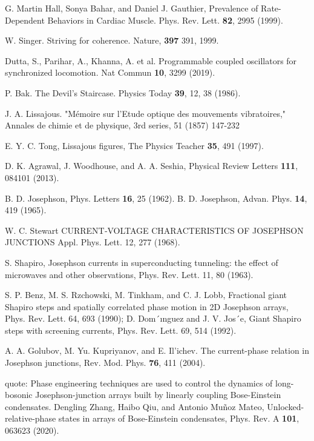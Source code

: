 \documentclass[twocolumn,preprintnumbers,amsmath,amssymb,aps,prx]{revtex4}
\begin{document}
\begin{thebibliography}{99}
   G. Martin Hall, Sonya Bahar, and Daniel J. Gauthier, Prevalence of Rate-Dependent Behaviors in Cardiac Muscle. Phys. Rev. Lett. {\bf 82}, 2995 (1999).

   W. Singer. Striving for coherence. Nature, {\bf 397} 391, 1999.

     Dutta, S., Parihar, A., Khanna, A. et al. Programmable coupled oscillators for synchronized locomotion. Nat Commun {\bf 10}, 3299 (2019).
    
     P. Bak. The Devil's Staircase. Physics Today {\bf 39}, 12, 38 (1986).

     J. A. Lissajous.  "Mémoire sur l'Etude optique des mouvements vibratoires,"  Annales de chimie et de physique, 3rd series, 51 (1857) 147-232

     E. Y. C. Tong, Lissajous figures, The Physics Teacher {\bf 35}, 491 (1997).

     D. K. Agrawal, J. Woodhouse, and A. A. Seshia, Physical Review Letters {\bf 111}, 084101 (2013).

     B. D. Josephson, Phys. Letters {\bf 16}, 25 (1962). 
     B. D. Josephson, Advan. Phys. {\bf 14}, 419 (1965).

      W. C. Stewart CURRENT‐VOLTAGE CHARACTERISTICS OF JOSEPHSON JUNCTIONS Appl. Phys. Lett. 12, 277 (1968).
      
     S. Shapiro, Josephson currents in superconducting tunneling: the effect of microwaves and other observations, Phys. Rev. Lett. 11, 80 (1963).

      S. P. Benz, M. S. Rzchowski, M. Tinkham, and C. J. Lobb, Fractional giant Shapiro steps and spatially correlated phase motion in 2D Josephson arrays, Phys. Rev. Lett. 64, 693 (1990); D. Dom´ınguez and J. V. Jos´e, Giant Shapiro steps with screening currents, Phys. Rev. Lett. 69,
514 (1992).

     A. A. Golubov, M. Yu. Kupriyanov, and E. Il’ichev. The current-phase relation in Josephson junctions, Rev. Mod. Phys. {\bf 76}, 411 (2004).

      quote: Phase engineering techniques are used to control the dynamics of long-bosonic Josephson-junction arrays built by linearly coupling Bose-Einstein condensates.
     Dengling Zhang, Haibo Qiu, and Antonio Muñoz Mateo, Unlocked-relative-phase states in arrays of Bose-Einstein condensates, Phys. Rev. A {\bf 101}, 063623 (2020).


\end{thebibliography}
\end{document}
